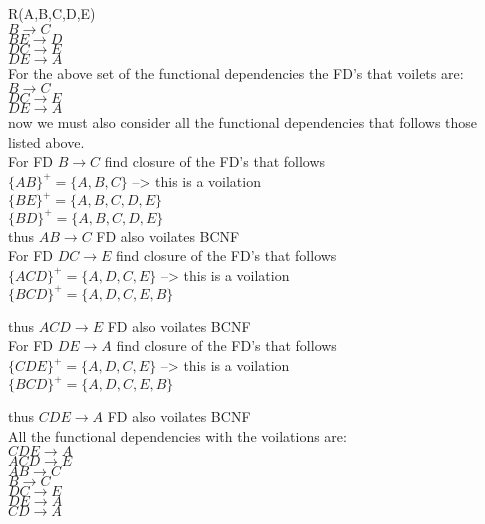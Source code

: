 R(A,B,C,D,E)\\
$B \rightarrow C$\\
$BE \rightarrow D$\\
$DC \rightarrow E$\\
$DE \rightarrow A$\\


For the above set of the functional dependencies the FD's that voilets are: \\ 
$B \rightarrow C$\\
$DC \rightarrow E$\\
$DE \rightarrow A$\\

now we must also consider all the functional dependencies that follows those listed above.\\

For FD $B \rightarrow C$ find closure of the FD's that follows\\
$\{AB\}^+ = \{ A,B,C\}$  --> this is a voilation\\
$\{BE\}^+ = \{ A,B,C,D,E\}$ \\
$\{BD\}^+ = \{ A,B,C,D,E\}$ \\

thus $AB \rightarrow C$ FD also voilates BCNF \\

For FD $DC \rightarrow E$ find closure of the FD's that follows\\
$\{ACD\}^+ = \{ A,D,C,E\}$  --> this is a voilation\\
$\{BCD\}^+ = \{ A,D,C,E,B\}$

thus $ACD \rightarrow E$ FD also voilates BCNF \\




For FD $DE \rightarrow A$ find closure of the FD's that follows\\
$\{CDE\}^+ = \{ A,D,C,E\}$  --> this is a voilation\\
$\{BCD\}^+ = \{ A,D,C,E,B\}$

thus $CDE \rightarrow A$ FD also voilates BCNF \\

All the functional dependencies with the voilations are:\\
$CDE \rightarrow A$\\
$ACD \rightarrow E$\\
$AB \rightarrow C$\\
$B \rightarrow C$\\
$DC \rightarrow E$\\
$DE \rightarrow A$\\
$CD \rightarrow A$\\
